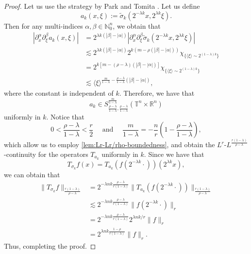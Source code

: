 \documentclass[12pt, reqno]{amsart}
\theoremstyle{definition}
\theoremstyle{remark}
\numberwithin{equation}{section}
\begin{document}
\begin{proof}
    Let us use the strategy by Park and Tomita \cite{park-tomita}. Let us define    
    \begin{equation*}
        a_k(x, \xi) := \tilde{\sigma}_k(2^{-\lambda k}x, 2^{\lambda k} \xi).
    \end{equation*}
    Then for any multi-indices $\alpha, \beta \in \mathbb{N}_0^n$, we obtain that
    \begin{align*}
        |\partial_x^\alpha\partial_\xi^\beta a_k(x, \xi)| & = 2^{\lambda k(|\beta|-|\alpha|)} |\partial_x^\alpha\partial_\xi^\beta \tilde{\sigma}_k(2^{-\lambda k}x, 2^{\lambda k} \xi)| \\
        & \lesssim 2^{\lambda k(|\beta|-|\alpha|)} 2^{k(m - \rho(|\beta|-|\alpha|))} \chi_{ \{ \langle\xi\rangle \sim 2^{(1-\lambda)k} \} } \\
        & =  2^{ k[m - (\rho-\lambda)(|\beta|-|\alpha|)] } \chi_{ \{ \langle\xi\rangle \sim 2^{(1-\lambda)k} \} } \\
        & \lesssim  \langle\xi\rangle^{ \frac{m}{1-\lambda}  -  \frac{\rho-\lambda}{1-\lambda}(|\beta|-|\alpha|) },
    \end{align*}
    where the constant is independent of $k$. Therefore, we have that 
    \begin{equation*}
        a_k \in S^{\frac{m}{1-\lambda}}_{ \frac{\rho-\lambda}{1-\lambda} , \frac{\rho-\lambda}{1-\lambda} } (\mathbb{T}^n\times\mathbb{R}^n)
    \end{equation*}
    uniformly in $k$. Notice that 
    \begin{equation*}
        0 < \frac{\rho-\lambda}{1-\lambda} < \frac{r}{2} \quad \text{ and } \quad \frac{m}{1-\lambda} = -\frac{n}{r} \left(  1 - \frac{\rho-\lambda}{1-\lambda}
        \right),
    \end{equation*}
    which allow us to employ \cref{lem:Lr-Lr/rho-boundedness}, and obtain the $L^r$-$L^\frac{r(1-\lambda)}{\rho-\lambda}$-continuity for the operators $T_{a_k}$ uniformly in $k$. Since we have that 
    \begin{equation*}
        T_{\sigma_k}f(x) = T_{a_k}(f(2^{-\lambda k}\cdot ))(2^{
        \lambda k
        }x),
    \end{equation*}
    we can obtain that 
    \begin{align*}
        \|T_{\sigma_k}f\|_\frac{r(1-\lambda)}{\rho-\lambda} &= 2^{ -\lambda nk \frac{\rho-\lambda}{r(1-\lambda)} } \|T_{a_k}(f(2^{-\lambda k} \cdot))\|_\frac{r(1-\lambda)}{\rho-\lambda} \\
        & \lesssim 2^{ -\lambda nk \frac{\rho-\lambda}{r(1-\lambda)} } \|f(2^{-\lambda k} \cdot)\|_r \\
        & =  2^{ -\lambda nk \frac{\rho-\lambda}{r(1-\lambda)} } 2^{\lambda nk/r} \|f\|_r \\
        & =  2^{ \lambda nk \frac{1-\rho}{r(1-\lambda)} } \|f\|_r.
    \end{align*}
    Thus, completing the proof.
\end{proof}
\end{document}
